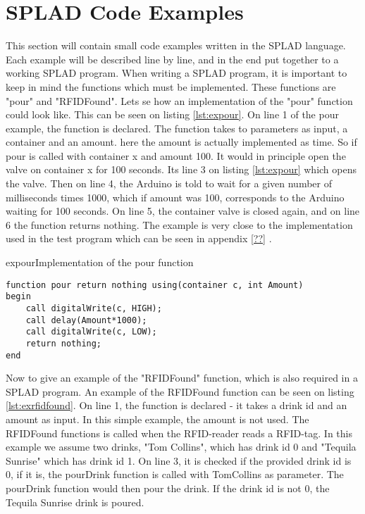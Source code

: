 \section{SPLAD Code Examples}
This section will contain small code examples written in the SPLAD language. Each example will be described line by line, and in the end put together to a working SPLAD program.
When writing a SPLAD program, it is important to keep in mind the functions which must be implemented. These functions are "pour" and "RFIDFound". Lets se how an implementation of the "pour" function could look like. This can be seen on listing \ref{lst:expour}. On line 1 of the pour example, the function is declared. The function takes to parameters as input, a container and an amount. here the amount is actually implemented as time. So if pour is called with container x and amount 100. It would in principle open the valve on container x for 100 seconds. Its line 3 on listing \ref{lst:expour} which opens the valve. Then on line 4, the Arduino is told to wait for a given number of milliseconds times 1000, which if amount was 100, corresponds to the Arduino waiting for 100 seconds. On line 5, the container valve is closed again, and on line 6 the function returns nothing. The example is very close to the implementation used in the test program which can be seen in appendix \ref{??} .

\begin{code}{expour}{Implementation of the pour function}
\begin{lstlisting}
function pour return nothing using(container c, int Amount)
begin
	call digitalWrite(c, HIGH);
	call delay(Amount*1000);
	call digitalWrite(c, LOW);
	return nothing;
end
\end{lstlisting}
\end{code}

Now to give an example of the "RFIDFound" function, which is also required in a SPLAD program. An example of the RFIDFound function can be seen on listing \ref{lst:exrfidfound}. On line 1, the function is declared - it takes a drink id and an amount as input. In this simple example, the amount is not used. The RFIDFound functions is called when the RFID-reader reads a RFID-tag. In this example we assume two drinks, "Tom Collins", which has drink id 0 and "Tequila Sunrise" which has drink id 1. On line 3, it is checked if the provided drink id is 0, if it is, the pourDrink function is called with TomCollins as parameter. The pourDrink function would then pour the drink. If the drink id is not 0, the Tequila Sunrise drink is poured.   

